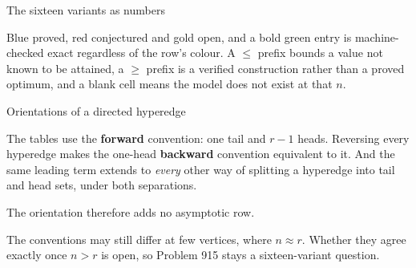 \documentclass[aspectratio=1610,11pt]{beamer}
\begin{document}

\begin{frame}{The sixteen variants as numbers}
\vfill
\centering
{}

\vspace{6pt}
{\scriptsize\color{black!60} Blue proved, red conjectured and gold open, and a bold green entry is machine-checked exact regardless of the row's colour. A $\le$ prefix bounds a value not known to be attained, a $\ge$ prefix is a verified construction rather than a proved optimum, and a blank cell means the model does not exist at that $n$.}
\vfill
\end{frame}

\begin{frame}{Orientations of a directed hyperedge}
\vfill
\centering
\begin{minipage}{0.86\textwidth}
{\small The tables use the \textbf{forward} convention: one tail and $r-1$ heads. Reversing every hyperedge makes the one-head \textbf{backward} convention equivalent to it. And the same leading term extends to \emph{every} other way of splitting a hyperedge into tail and head sets, under both separations.}
\end{minipage}

\vspace{22pt}
{\color{KULblauw3b}\large The orientation therefore adds no asymptotic row.}

\vspace{22pt}
\begin{minipage}{0.86\textwidth}
{\footnotesize\color{black!60} The conventions may still differ at few vertices, where $n\approx r$. Whether they agree exactly once $n>r$ is open, so Problem 915 stays a sixteen-variant question.}
\end{minipage}
\vfill
\end{frame}
\end{document}
